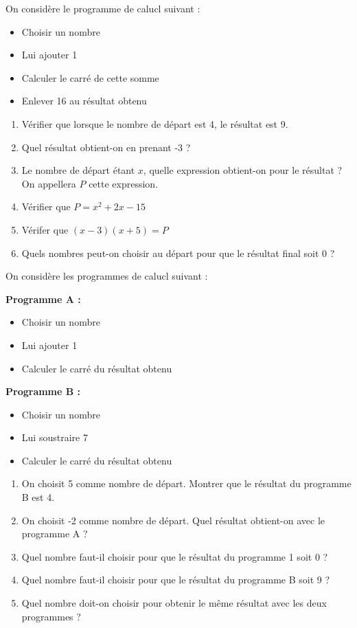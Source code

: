 
On considère le programme de calucl suivant :
\begin{itemize}
    \item Choisir un nombre
    \item Lui ajouter 1
    \item Calculer le carré de cette somme
    \item Enlever 16 au résultat obtenu
\end{itemize}

\begin{enumerate}
    \item Vérifier que lorsque le nombre de départ est 4, le résultat est 9.
    \item Quel résultat obtient-on en prenant -3 ?
    \item Le nombre de départ étant $x$, quelle expression obtient-on pour le résultat ? On appellera $P$ cette expression.
    \item Vérifier que $P=x^2+2x-15$
    \item Vérifer que $(x-3)(x+5)=P$
    \item Quels nombres peut-on choisir au départ pour que le résultat final soit 0 ?
\end{enumerate}


On considère les programmes de calucl suivant :
\begin{multicols}{2}
    \textbf{Programme A :}
    \begin{itemize}
        \item Choisir un nombre
        \item Lui ajouter 1
        \item Calculer le carré du résultat obtenu
    \end{itemize}

    \textbf{Programme B :}
    \begin{itemize}
        \item Choisir un nombre
        \item Lui soustraire 7
        \item Calculer le carré du résultat obtenu
    \end{itemize}
\end{multicols}

\begin{enumerate}
    \item On choisit 5 comme nombre de départ. Montrer que le résultat du programme B est 4.
    \item On choisit -2 comme nombre de départ. Quel résultat obtient-on avec le programme A ?
    \item Quel nombre faut-il choisir pour que le résultat du programme 1 soit 0 ?
    \item Quel nombre faut-il choisir pour que le résultat du programme B soit 9 ?
    \item Quel nombre doit-on choisir pour obtenir le même résultat avec les deux programmes ?
\end{enumerate}
